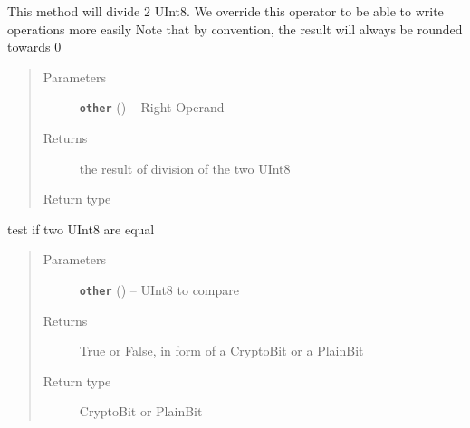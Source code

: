 \documentclass[letterpaper,10pt,english]{sphinxmanual}
\begin{document}
\begin{fulllineitems}
\begin{fulllineitems}
\end{fulllineitems}


\begin{fulllineitems}
\label{datatypes.integers:datatypes.integers.UInt8.UInt8.__div__}
This method will divide 2 UInt8.
We override this operator to be able to write operations more easily
Note that by convention, the result will always be rounded towards 0
\begin{quote}\begin{description}
\item[{Parameters}] \leavevmode
\textbf{\texttt{other}} ({\hyperref[datatypes.integers:datatypes.integers.UInt8.UInt8]{}}) -- Right Operand

\item[{Returns}] \leavevmode
the result of division of the two UInt8

\item[{Return type}] \leavevmode
{\hyperref[datatypes.integers:datatypes.integers.UInt8.UInt8]{}}

\end{description}\end{quote}

\end{fulllineitems}


\begin{fulllineitems}
\label{datatypes.integers:datatypes.integers.UInt8.UInt8.__eq__}
test if two UInt8 are equal
\begin{quote}\begin{description}
\item[{Parameters}] \leavevmode
\textbf{\texttt{other}} ({\hyperref[datatypes.integers:datatypes.integers.UInt8.UInt8]{}}) -- UInt8 to compare

\item[{Returns}] \leavevmode
True or False, in form of a CryptoBit or a PlainBit

\item[{Return type}] \leavevmode
CryptoBit or PlainBit

\end{description}\end{quote}


\end{fulllineitems}
\end{fulllineitems}
\end{document}
